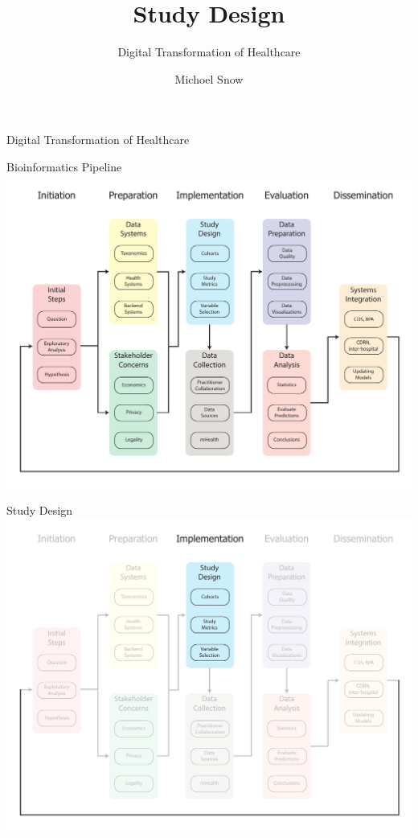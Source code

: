 \documentclass[10pt]{beamer}
\title{Study Design}
\subtitle{Digital Transformation of Healthcare}
\date{}
\author{Michoel Snow}
\institute{Center for Health Data Innovations}
\begin{document}
\maketitle




\begin{frame}{Digital Transformation of Healthcare}
%		
\end{frame}


\begin{frame}{Bioinformatics Pipeline}
	\includegraphics[width=1\textwidth]{images/informatics_pipeline.pdf}
\end{frame}


\begin{frame}{Study Design}
	\includegraphics[width=1\textwidth]{images/informatics_pipeline_studydesign.pdf}
\end{frame}
\end{document}
